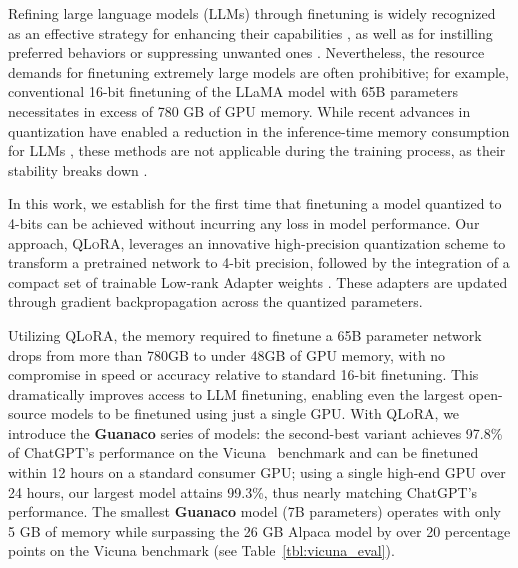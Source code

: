 Refining large language models (LLMs) through finetuning is widely recognized as an effective strategy for enhancing their capabilities \citep{min2021metaicl, wei2021finetuned, ouyang2022training, wang2022super, wang2022self, liu2022few}, as well as for instilling preferred behaviors or suppressing unwanted ones \citep{ouyang2022training,askell2021general,bai2022training}. Nevertheless, the resource demands for finetuning extremely large models are often prohibitive; for example, conventional 16-bit finetuning of the LLaMA model with 65B parameters~\citep{touvron2023llama} necessitates in excess of 780 GB of GPU memory. While recent advances in quantization have enabled a reduction in the inference-time memory consumption for LLMs \citep{dettmers2022llm, dettmers2022case, frantar2022gptq, xiao2022smoothquant}, these methods are not applicable during the training process, as their stability breaks down \citep{wortsman2023stable}.

In this work, we establish for the first time that finetuning a model quantized to 4-bits can be achieved without incurring any loss in model performance. Our approach, \textsc{QLoRA}, leverages an innovative high-precision quantization scheme to transform a pretrained network to 4-bit precision, followed by the integration of a compact set of trainable Low-rank Adapter weights \citep{hu2021lora}. These adapters are updated through gradient backpropagation across the quantized parameters.

Utilizing \textsc{QLoRA}, the memory required to finetune a 65B parameter network drops from more than 780GB to under 48GB of GPU memory, with no compromise in speed or accuracy relative to standard 16-bit finetuning. This dramatically improves access to LLM finetuning, enabling even the largest open-source models to be finetuned using just a single GPU. With \textsc{QLoRA}, we introduce the \textbf{Guanaco} series of models: the second-best variant achieves 97.8\% of ChatGPT’s performance on the Vicuna~\citep{vicuna2023} benchmark and can be finetuned within 12 hours on a standard consumer GPU; using a single high-end GPU over 24 hours, our largest model attains 99.3\%, thus nearly matching ChatGPT’s performance. The smallest \textbf{Guanaco} model (7B parameters) operates with only 5 GB of memory while surpassing the 26 GB Alpaca model by over 20 percentage points on the Vicuna benchmark (see Table~\ref{tbl:vicuna_eval}).

